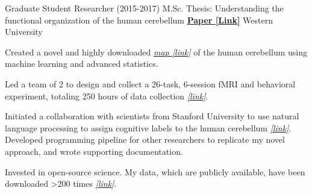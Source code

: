 \begin{cventries}
  \cventry
    {Graduate Student Researcher (2015-2017)} %
    {M.Sc. Thesis: Understanding the functional organization of the human cerebellum}
    {\href{http://ivrylab.berkeley.edu/uploads/4/1/1/5/41152143/functional_boundaries_in_the_human_cerebellum.pdf}{\textbf{Paper [Link]}}}
    {Western University} %
    {
      \begin{cvitems} %
        \item {Created a novel and highly downloaded {\href{http://www.diedrichsenlab.org/imaging/mdtb.htm}{\textit{ map [link]}}} of the human cerebellum using machine learning and advanced statistics.}
      	\item {Led a team of 2 to design and collect a 26-task, 6-session fMRI and behavioral experiment, totaling 250 hours of data collection {\href{http://www.diedrichsenlab.org/imaging/AtlasViewer/viewer.html}{\textit{[link]}}}.}
      	\item {Initiated a collaboration with scientists from Stanford University to use natural language processing to assign cognitive labels to the human cerebellum {\href{https://cognitiveatlas.org/}{\textit{[link]}}}. Developed programming pipeline for other researchers to replicate my novel approach, and wrote supporting documentation.}
      	\item {Invested in open-source science. My data, which are publicly available, have been downloaded >200 times {\href{https://openneuro.org/datasets/ds002105/versions/1.1.0}{\textit{[link]}}}.}
      \end{cvitems}
    }

\end{cventries}

